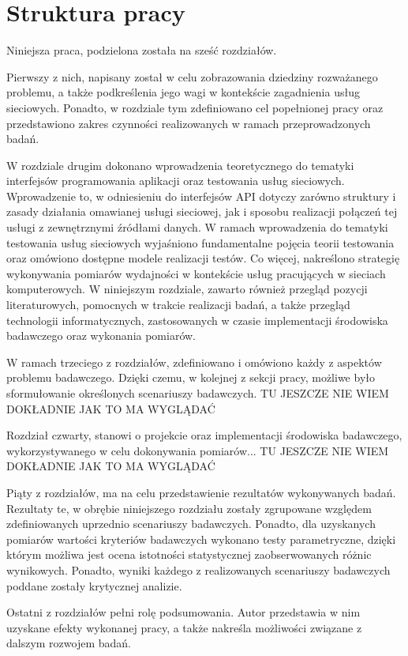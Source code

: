 \section{Struktura pracy}
Niniejsza praca, podzielona została na sześć rozdziałów.

Pierwszy z nich, napisany został w celu zobrazowania dziedziny rozważanego problemu, a także podkreślenia jego wagi w kontekście zagadnienia usług sieciowych. Ponadto, w rozdziale tym zdefiniowano cel popełnionej pracy oraz przedstawiono zakres czynności realizowanych w ramach przeprowadzonych badań.

W rozdziale drugim dokonano wprowadzenia teoretycznego do tematyki interfejsów programowania aplikacji oraz testowania usług sieciowych. Wprowadzenie to, w odniesieniu do interfejsów API dotyczy zarówno struktury i zasady działania omawianej usługi sieciowej, jak i sposobu realizacji połączeń tej usługi z zewnętrznymi źródłami danych. W ramach wprowadzenia do tematyki testowania usług sieciowych wyjaśniono fundamentalne pojęcia teorii testowania oraz omówiono dostępne modele realizacji testów. Co więcej, nakreślono strategię wykonywania pomiarów wydajności w kontekście usług pracujących w sieciach komputerowych. W niniejszym rozdziale, zawarto również przegląd pozycji literaturowych, pomocnych w trakcie realizacji badań, a także przegląd technologii informatycznych, zastosowanych w czasie implementacji środowiska badawczego oraz wykonania pomiarów.

W ramach trzeciego z rozdziałów, zdefiniowano i omówiono każdy z aspektów problemu badawczego. Dzięki czemu, w kolejnej z sekcji pracy, możliwe było sformułowanie określonych scenariuszy badawczych. TU JESZCZE NIE WIEM DOKŁADNIE JAK TO MA WYGLĄDAĆ 

Rozdział czwarty, stanowi o projekcie oraz implementacji środowiska badawczego, wykorzystywanego w celu dokonywania pomiarów... TU JESZCZE NIE WIEM DOKŁADNIE JAK TO MA WYGLĄDAĆ

Piąty z rozdziałów, ma na celu przedstawienie rezultatów wykonywanych badań. Rezultaty te, w obrębie niniejszego rozdziału zostały zgrupowane względem zdefiniowanych uprzednio scenariuszy badawczych. Ponadto, dla uzyskanych pomiarów wartości kryteriów badawczych wykonano testy parametryczne, dzięki którym możliwa jest ocena istotności statystycznej zaobserwowanych różnic wynikowych. Ponadto, wyniki każdego z realizowanych scenariuszy badawczych poddane zostały krytycznej analizie.

Ostatni z rozdziałów pełni rolę podsumowania. Autor przedstawia w nim uzyskane efekty wykonanej pracy, a także nakreśla możliwości związane z dalszym rozwojem badań.